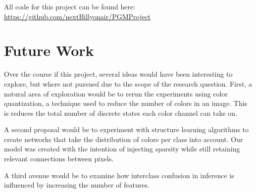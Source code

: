 \documentclass{article}
\begin{document}
All code for this project can be found here: \url{https://github.com/nextBillyonair/PGMProject}


\section{Future Work}
Over the course if this project, several ideas would have been interesting to
explore, but where not pursued due to the scope of the research question. First,
a natural area of exploration would be to rerun the experiments using color
quantization, a technique used to reduce the number of colors in an image. This
is reduces the total number of discrete states each color channel can take on.

A second proposal would be to experiment with structure learning algorithms to
create networks that take the distribution of colors per class into account.
Our model was created with the intention of injecting sparsity while still
retaining relevant connections between pixels.

A third avenue would be to examine how interclass confusion in inference
is influenced by increasing the number of features.








\end{document}
